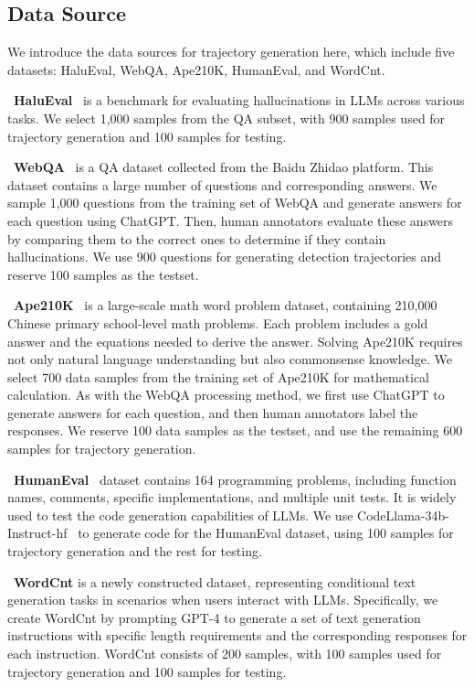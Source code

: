 \subsection{Data Source}
\label{app: data_source}
We introduce the data sources for trajectory generation here, which include five datasets: HaluEval, WebQA, Ape210K, HumanEval, and WordCnt.

\textbullet~\textbf{HaluEval}~\cite{li2023halueval} is a benchmark for evaluating hallucinations in LLMs across various tasks. 
We select 1,000 samples from the QA subset, with 900 samples used for trajectory generation and 100 samples for testing.

\textbullet~\textbf{WebQA}~\cite{li2016dataset} is a QA dataset collected from the Baidu Zhidao platform. 
This dataset contains a large number of questions and corresponding answers. 
We sample 1,000 questions from the training set of WebQA and generate answers for each question using ChatGPT. Then, human annotators evaluate these answers by comparing them to the correct ones to determine if they contain hallucinations. 
We use 900 questions for generating detection trajectories and reserve 100 samples as the testset.

\textbullet~\textbf{Ape210K}~\cite{zhao2020ape210k} is a large-scale math word problem dataset, containing 210,000 Chinese primary school-level math problems. 
Each problem includes a gold answer and the equations needed to derive the answer. Solving Ape210K requires not only natural language understanding but also commonsense knowledge. 
We select 700 data samples from the training set of Ape210K for mathematical calculation. As with the WebQA processing method, we first use ChatGPT to generate answers for each question, and then human annotators label the responses. 
We reserve 100 data samples as the testset, and use the remaining 600 samples for trajectory generation.

\textbullet~\textbf{HumanEval}~\cite{chen2021evaluating} dataset contains 164 programming problems, including function names, comments, specific implementations, and multiple unit tests. It is widely used to test the code generation capabilities of LLMs. We use CodeLlama-34b-Instruct-hf~\cite{roziere2023code} to generate code for the HumanEval dataset, using 100 samples for trajectory generation and the rest for testing.

\textbullet~\textbf{WordCnt} is a newly constructed dataset, representing conditional text generation tasks in scenarios when users interact with LLMs. Specifically, we create WordCnt by prompting GPT-4 to generate a set of text generation instructions with specific length requirements and the corresponding responses for each instruction. WordCnt consists of 200 samples, with 100 samples used for trajectory generation and 100 samples for testing.


